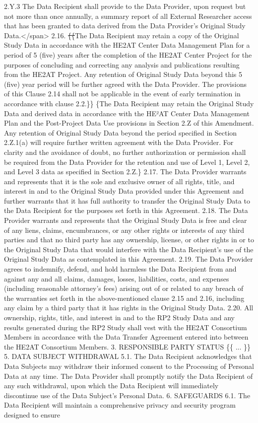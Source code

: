 \documentclass[12pt,letterpaper]{article}
\newcommand{\deleted}[1]{\textcolor{deletecolor}{\sout{#1}}}
\newcommand{\added}[1]{\textcolor{addcolor}{#1}}
\begin{document}
2.Y.3 The Data Recipient shall provide to the Data Provider, upon request but not more than once annually, a summary report of all External Researcher access that has been granted to data derived from the Data Provider's Original Study Data.</span> 2.16. \deleted\{\deleted\{The Data Recipient may retain a copy of the Original Study Data in accordance with the HE2AT Center Data Management Plan for a period of 5 (five) years after the completion of the HE2AT Center Project for the purposes of concluding and correcting any analysis and publications resulting from the HE2AT Project. Any retention of Original Study Data beyond this 5 (five) year period will be further agreed with the Data Provider. The provisions of this Clause 2.14 shall not be applicable in the event of early termination in accordance with clause 2.2.\}\} \added\{The Data Recipient may retain the Original Study Data and derived data in accordance with the HE²AT Center Data Management Plan and the Post-Project Data Use provisions in Section 2.Z of this Amendment. Any retention of Original Study Data beyond the period specified in Section 2.Z.1(a) will require further written agreement with the Data Provider. For clarity and the avoidance of doubt, no further authorization or permission shall be required from the Data Provider for the retention and use of Level 1, Level 2, and Level 3 data as specified in Section 2.Z.\} 2.17.	The Data Provider warrants and represents that it is the sole and exclusive owner of all rights, title, and interest in and to the Original Study Data provided under this Agreement and further warrants that it has full authority to transfer the Original Study Data to the Data Recipient for the purposes set forth in this Agreement. 2.18.	The Data Provider warrants and represents that the Original Study Data is free and clear of any liens, claims, encumbrances, or any other rights or interests of any third parties and that no third party has any ownership, license, or other rights in or to the Original Study Data that would interfere with the Data Recipient’s use of the Original Study Data as contemplated in this Agreement. 2.19.	The Data Provider agrees to indemnify, defend, and hold harmless the Data Recipient from and against any and all claims, damages, losses, liabilities, costs, and expenses (including reasonable attorney’s fees) arising out of or related to any breach of the warranties set forth in the above-mentioned clause 2.15 and 2.16, including any claim by a third party that it has rights in the Original Study Data. 2.20.	All ownership, rights, title, and interest in and to the RP2 Study Data and any results generated during the RP2 Study shall vest with the HE2AT Consortium Members in accordance with the Data Transfer Agreement entered into between the HE2AT Consortium Members.  3.	RESPONSIBLE PARTY STATUS \{\{ ... \}\} 5.	DATA SUBJECT WITHDRAWAL 5.1.	The Data Recipient acknowledges that Data Subjects may withdraw their informed consent to the Processing of Personal Data at any time. The Data Provider shall promptly notify the Data Recipient of any such withdrawal, upon which the Data Recipient will immediately discontinue use of the Data Subject’s Personal Data. 6.	SAFEGUARDS 6.1.	The Data Recipient will maintain a comprehensive privacy and security program designed to ensure 
\end{document}
